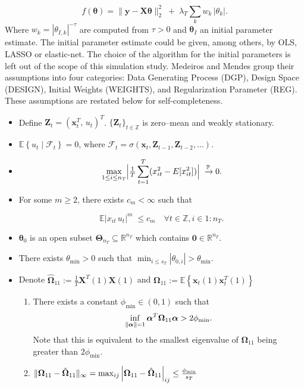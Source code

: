 \documentclass[10pt,a4paper,oneside]{article}
\newcommand{\Z}{\mathbb{Z}}
\newcommand{\R}{\mathbb{R}}
\newcommand{\Prob}{\mathbb{P}}
\newcommand{\E}{\mathbb{E}}
\newcommand{\SigAl}{\mathcal{F}}
\DeclarePairedDelimiter{\norma}{\lVert}{\rVert} %
\begin{document}
\[
        f(\boldsymbol{\theta}) = \bigl\|\mathbf{y} -  \mathbf{X}\boldsymbol{\theta}\bigr\|_2^2
        \;+\;\lambda_T\sum_{k} w_k\,|\theta_k|.
\]
Where $w_k = \left| \theta_{I, k} \right|^{-\tau}$ are computed from $\tau > 0$ and $\boldsymbol{\theta}_I$ an initial parameter estimate. The initial parameter estimate could be given, among others, by OLS, LASSO or elastic-net. The choice of the algorithm for the initial parameters is left out of the scope of this simulation study. Medeiros and Mendes group their assumptions into four categories: Data Generating Process (DGP), Design Space (DESIGN), Initial Weights (WEIGHTS), and Regularization Parameter (REG). These assumptions are restated below for self-completeness.


\begin{itemize}
  \item[(DGP1)] Define $\mathbf{Z}_t = (\mathbf{x}_t^T,\,u_t)^T$. $\{\mathbf{Z}_t\}_{t \in \Z}$ is zero–mean and weakly stationary.
  \item[(DGP2)] $\E \left\{ u_t\mid \SigAl_t\right\}=0$, where $\SigAl_t=\sigma(\mathbf{x}_t, \mathbf{Z}_{t-1}, \mathbf{Z}_{t-2},\dots)$.
  \item[(DGP3)] 
  \[
     \max_{1\le i\le n_T}\Bigl|\tfrac1T\sum_{t=1}^T(x_{it}^2 - E[x_{it}^2])\Bigr|\;\xrightarrow[]{\Prob}0.
  \]
  \item[(DGP4)] For some $m \geq 2$, there exists $c_m < \infty$ such that
  
  \[
     \E\bigl|x_{it}\,u_t\bigr|^m\;\le c_m \quad \forall t\in \Z, i \in1:n_T.
  \]

  \item[(DESIGN1)] $\mathbf{\theta}_0$ is an open subset $\boldsymbol{\Theta}_{n_T} \subseteq \R^{n_T}$ which contains $\mathbf{0} \in \R^{n_T}$.
  \item[(DESIGN2)] There exists $\theta_{\min} > 0$ such that $\min_{i\le s_T}|\theta_{0,i}|>\theta_{\min}$.
  \item[(DESIGN3)] Denote $\hat{\boldsymbol{\Omega}}_{11} := \frac{1}{T}\mathbf{X}^T(1) \mathbf{X}(1)$ and $\boldsymbol{\Omega}_{11} := \E \left\{ \mathbf{x}_t(1) \mathbf{x}^T_t(1) \right\}$
    \begin{enumerate}
      \item[(a)] There exists a constant $\phi_{\min} \in (0, 1)$ such that
      $$
      \inf_{\norma{\boldsymbol{\alpha}} = 1} \boldsymbol{\alpha}^T \boldsymbol{\Omega}_{11} \boldsymbol{\alpha} > 2 \phi_{\min}.
      $$
      Note that this is equivalent to the smallest eigenvalue of $\boldsymbol{\Omega}_{11}$ being greater than $2\phi_{\min}$.
      \item[(b)] $\norma{\boldsymbol{\Omega}_{11} - \hat{\boldsymbol{\Omega}}_{11}}_{\infty} = \max_{ij} \left| \boldsymbol{\Omega}_{11} - \hat{\boldsymbol{\Omega}}_{11}\right|_{ij} \leq \frac{\phi_{\min}}{s_T}$
      

\end{enumerate}
\end{itemize}
\end{document}
